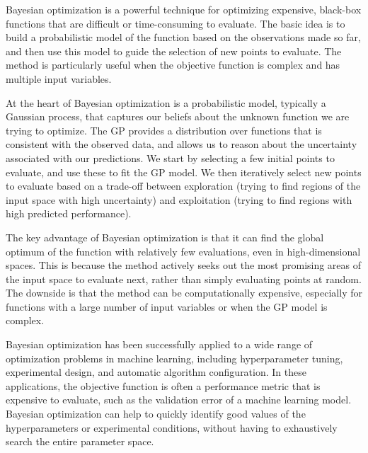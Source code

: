 \documentclass{IOS-Book-Article}
\begin{document}
Bayesian optimization is a powerful technique for optimizing expensive, black-box functions that are difficult or time-consuming to evaluate. The basic idea is to build a probabilistic model of the function based on the observations made so far, and then use this model to guide the selection of new points to evaluate. The method is particularly useful when the objective function is complex and has multiple input variables.

At the heart of Bayesian optimization is a probabilistic model, typically a Gaussian process, that captures our beliefs about the unknown function we are trying to optimize. The GP provides a distribution over functions that is consistent with the observed data, and allows us to reason about the uncertainty associated with our predictions. We start by selecting a few initial points to evaluate, and use these to fit the GP model. We then iteratively select new points to evaluate based on a trade-off between exploration (trying to find regions of the input space with high uncertainty) and exploitation (trying to find regions with high predicted performance).

The key advantage of Bayesian optimization is that it can find the global optimum of the function with relatively few evaluations, even in high-dimensional spaces. This is because the method actively seeks out the most promising areas of the input space to evaluate next, rather than simply evaluating points at random. The downside is that the method can be computationally expensive, especially for functions with a large number of input variables or when the GP model is complex.

Bayesian optimization has been successfully applied to a wide range of optimization problems in machine learning, including hyperparameter tuning, experimental design, and automatic algorithm configuration. In these applications, the objective function is often a performance metric that is expensive to evaluate, such as the validation error of a machine learning model. Bayesian optimization can help to quickly identify good values of the hyperparameters or experimental conditions, without having to exhaustively search the entire parameter space.
\end{document}
